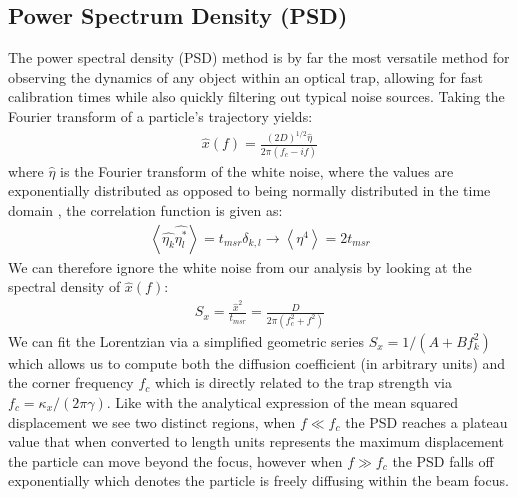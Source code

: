 \subsection{Power Spectrum Density (PSD)}
The power spectral density (PSD) method is by far the most versatile method for observing the dynamics of any object within an optical trap, allowing for fast calibration times while also quickly filtering out typical noise sources. Taking the Fourier transform of a particle's trajectory yields:
\begin{align}
	\hat{x}(f) = \frac{(2D)^{1/2}\hat{\eta}}{2\pi(f_c-if)}
\end{align}
where $\hat{\eta}$ is the Fourier transform of the white noise, where the values are exponentially distributed as opposed to being normally distributed in the time domain \cite{BergSoerensen2004}, the correlation function is given as:
\begin{align}
	\left<\hat{\eta_k}\hat{\eta_l^*}\right> = t_{msr} \delta_{k,l} \rightarrow \left< \eta^4 \right> = 2t_{msr}
\end{align} 
We can therefore ignore the white noise from our analysis by looking at the spectral density of $\hat{x}(f)$: 
\begin{align}
	\label{eq:lorentzian}
	S_x = \frac{\hat{x}^2}{t_{msr}} = \frac{D}{2\pi(f_c^2+f^2)}
\end{align}
We can fit the Lorentzian via a simplified geometric series $S_x = 1/(A+Bf_k^2)$ which allows us to compute both the diffusion coefficient (in arbitrary units) and the corner frequency $f_c$ which is directly related to the trap strength via $f_c = \kappa_x/(2\pi\gamma)$. Like with the analytical expression of the mean squared displacement we see two distinct regions, when $f\ll f_c$ the PSD reaches a plateau value that when converted to length units represents the maximum displacement the particle can move beyond the focus, however when $f\gg f_c$ the PSD falls off exponentially which denotes the particle is freely diffusing within the beam focus.
